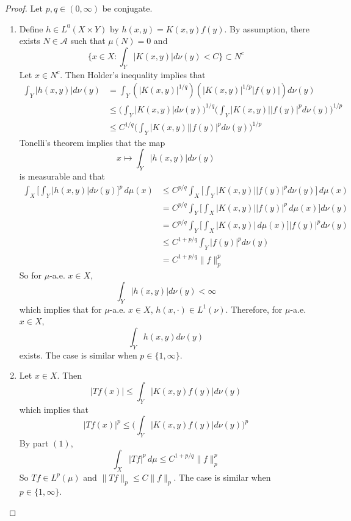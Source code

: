 \documentclass[12pt]{amsart}
\theoremstyle{definition}
\newcommand{\MA}{\mathcal{A}}
\newcommand{\dmu}{\, d \mu}
\begin{document}
	\begin{proof}Let $p,q \in (0,\infty)$ be conjugate.
	\begin{enumerate}
	\item Define $h \in L^0(X \times Y)$ by $h(x,y) = K(x, y) f(y)$. By assumption, there exists $N \in \MA$ such that $\mu(N) = 0$ and  $$\bigg \{x \in X: \int_Y |K(x, y)| d \nu(y) < C \bigg\} \subset N^c$$ 
	Let $x \in N^c$. Then Holder's inequality implies that
	\begin{align*}
	\int_Y |h(x,y)| d\nu(y) 
	&= \int_Y (|K(x,y)|^{1/q})(|K(x,y)|^{1/p}|f(y)|) d\nu(y) \\
	& \leq \bigg( \int_Y |K(x,y)| d \nu(y) \bigg)^{1/q} \bigg( \int_Y |K(x,y)||f(y)|^p d\nu(y) \bigg)^{1/p} \\
	& \leq C^{1/q} \bigg( \int_Y |K(x,y)||f(y)|^p d\nu(y) \bigg)^{1/p}
	\end{align*}
	Tonelli's theorem implies that the map $$x \mapsto \int_Y |h(x,y)| d\nu(y) $$ is measurable and that  
	\begin{align*}
	\int_X \bigg[ \int_Y |h(x,y)| d\nu(y) \bigg]^p \dmu(x) 
	&\leq  C^{p/q}  \int_X \bigg[ \int_Y |K(x,y)||f(y)|^p d\nu(y) \bigg] \dmu(x) \\
	&= C^{p/q}  \int_Y \bigg[ \int_X |K(x,y)||f(y)|^p \dmu(x) \bigg] d\nu(y) \\
	&= C^{p/q}  \int_Y \bigg[ \int_X |K(x,y)| \dmu(x) \bigg] |f(y)|^p d\nu(y) \\
	& \leq C^{1 + p/q} \int_Y |f(y)|^p  d\nu(y) \\
	& = C^{1 + p/q} \|f\|_p^p
	\end{align*}
	So for $\mu$-a.e. $x \in X$, $$\int_Y |h(x,y)| d\nu(y) < \infty$$ which implies that for $\mu$-a.e. $x \in X$, $h(x, \cdot) \in L^1(\nu)$. Therefore, for $\mu$-a.e. $x \in X$, $$\int_Y h(x,y) d\nu(y)$$ exists. The case is similar when $p \in \{1, \infty\}$.
	\item Let $x \in X$. Then $$|Tf(x)| \leq \int_Y |K(x,y)f(y)| d \nu(y)$$ which implies that $$|Tf(x)|^p \leq \bigg( \int_Y |K(x,y)f(y)| d \nu(y) \bigg)^p$$
	By part $(1)$, $$\int_X |Tf|^p \dmu \leq C^{1+p/q}\|f\|_p^p$$ 
	So $Tf \in L^p(\mu)$ and $\|Tf\|_p \leq C\|f\|_p$.
	The case is similar when $p \in \{1, \infty\}$.
	\end{enumerate}
	\end{proof}
	
	
	
	
	
	
	

	
	
\end{document}
